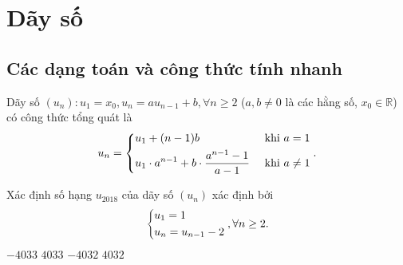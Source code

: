 \section{Dãy số}
\subsection{Các dạng toán và công thức tính nhanh}
\begin{dang}{}
	Dãy số $(u_n):u_1=x_0,u_n=au_{n-1}+b,\forall n\ge 2$ ($a,b\ne 0$ là các hằng số, $x_0\in \mathbb{R}$) có công thức tổng quát là
	\begin{align*}
		u_n=\left\{\begin{aligned}&u_1+(n-1)b&\text{ khi }a=1\\
			&u_1\cdot a^{n-1}+b\cdot\dfrac{a^{n-1}-1}{a-1}&\text{ khi }a\ne 1\end{aligned}\right..
	\end{align*}
\end{dang}
\begin{vd}%
	Xác định số hạng $u_{2018}$ của dãy số $(u_n)$ xác định bởi 
	$$\left\{\begin{aligned}
		&u_1=1\\ &u_n=u_{n-1}-2
	\end{aligned}\right.,\forall n\ge 2.$$
	\choice
	{\True $-4033$}
	{$4033$}
	{$-4032$}
	{$4032$}
\end{vd}
